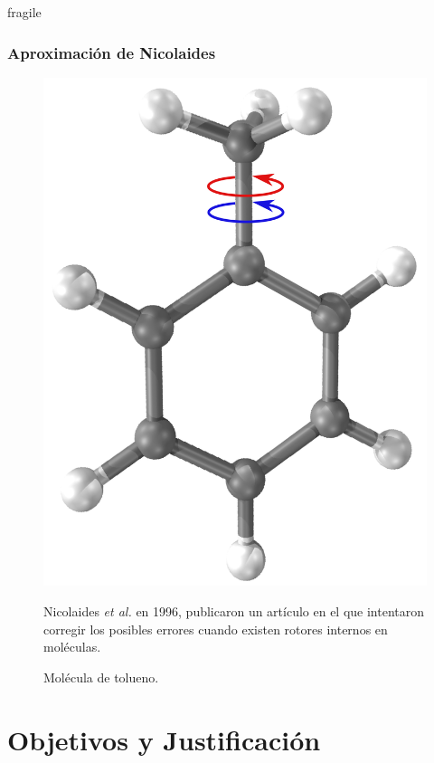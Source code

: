 \documentclass{beamer}
\begin{document}
\begin{frame}{fragile}
\frametitle{Aproximación de Nicolaides}
\begin{figure}
\includegraphics[scale=.24]{images/toluene.png}
\caption{Molécula de tolueno.}
Nicolaides \textit{et al.} en 1996, publicaron un artículo en el que intentaron corregir los posibles errores cuando existen rotores internos en moléculas.
\end{figure}
\end{frame}


\section{Objetivos y Justificación}
\end{document}

